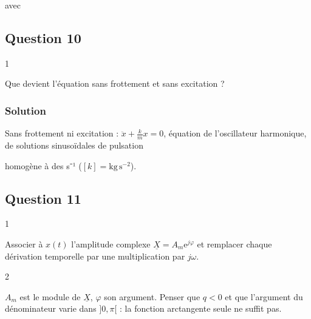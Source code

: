 \documentclass[11pt,a4paper]{article}
\newcommand{\equationajustee}[1]{%
  \sbox{\boiteequation}{$\displaystyle #1$}%
  \ifdim\wd\boiteequation>\linewidth
    \[\resizebox{\linewidth}{!}{\usebox{\boiteequation}}\]%
  \else
    \[#1\]%
  \fi}
\begin{document}
avec

\equationajustee{\begin{aligned}
\omega_0&=\sqrt{\frac km}\\
Q&=\omega_0\tau
\end{aligned}}

\hypertarget{question-10}{%
\subsection{Question 10}\label{question-10}}

\begin{indication}{1}

Que devient l'équation sans frottement et sans excitation ?

\end{indication}

\hypertarget{solution-9}{%
\subsubsection{Solution}\label{solution-9}}

Sans frottement ni excitation : \(\ddot x+\frac kmx=0\), équation de l'oscillateur harmonique, de solutions sinusoïdales de pulsation

\equationajustee{\boxed{\omega_0=\sqrt{\frac km}}}

homogène à des s⁻¹ (\([k]=\mathrm{kg\,s^{-2}}\)).

\hypertarget{question-11}{%
\subsection{Question 11}\label{question-11}}

\begin{indication}{1}

Associer à \(x(t)\) l'amplitude complexe \(\underline X=A_m\mathrm e^{j\varphi}\) et remplacer chaque dérivation temporelle par une multiplication par \(j\omega\).

\end{indication}

\begin{indication}{2}

\(A_m\) est le module de \(\underline X\), \(\varphi\) son argument. Penser que \(q<0\) et que l'argument du dénominateur varie dans \(]0,\pi[\) : la fonction arctangente seule ne suffit pas.

\end{indication}
\end{document}
